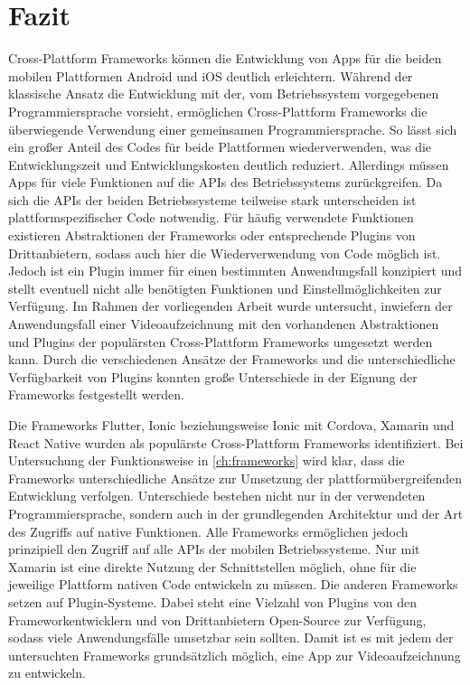 \chapter{Fazit}
\label{ch:fazit}


Cross-Plattform Frameworks können die Entwicklung von Apps für die beiden mobilen Plattformen Android und iOS deutlich erleichtern.
Während der klassische Ansatz die Entwicklung mit der, vom Betriebssystem vorgegebenen Programmiersprache vorsieht, ermöglichen Cross-Plattform Frameworks die überwiegende Verwendung einer gemeinsamen Programmiersprache.
So lässt sich ein großer Anteil des Codes für beide Plattformen wiederverwenden, was die Entwicklungszeit und Entwicklungskosten deutlich reduziert.
Allerdings müssen Apps für viele Funktionen auf die \acp{API} des Betriebssystems zurückgreifen.
Da sich die \acp{API} der beiden Betriebssysteme teilweise stark unterscheiden ist plattformspezifischer Code notwendig.
Für häufig verwendete Funktionen existieren Abstraktionen der Frameworks oder entsprechende Plugins von Drittanbietern, sodass auch hier die Wiederverwendung von Code möglich ist.
Jedoch ist ein Plugin immer für einen bestimmten Anwendungsfall konzipiert und stellt eventuell nicht alle benötigten Funktionen und Einstellmöglichkeiten zur Verfügung.
Im Rahmen der vorliegenden Arbeit wurde untersucht, inwiefern der Anwendungsfall einer Videoaufzeichnung mit den vorhandenen Abstraktionen und Plugins der populärsten Cross-Plattform Frameworks umgesetzt werden kann.
Durch die verschiedenen Ansätze der Frameworks und die unterschiedliche Verfügbarkeit von Plugins konnten große Unterschiede in der Eignung der Frameworks festgestellt werden.


Die Frameworks Flutter, Ionic beziehungsweise Ionic mit Cordova, Xamarin und React Native wurden als populärste Cross-Plattform Frameworks identifiziert.
Bei Untersuchung der Funktionsweise in \autoref{ch:frameworks} wird klar, dass die Frameworks unterschiedliche Ansätze zur Umsetzung der plattformübergreifenden Entwicklung verfolgen.
Unterschiede bestehen nicht nur in der verwendeten Programmiersprache, sondern auch in der grundlegenden Architektur und der Art des Zugriffs auf native Funktionen.
Alle Frameworks ermöglichen jedoch prinzipiell den Zugriff auf alle \acp{API} der mobilen Betriebssysteme.
Nur mit Xamarin ist eine direkte Nutzung der Schnittstellen möglich, ohne für die jeweilige Plattform nativen Code entwickeln zu müssen.
Die anderen Frameworks setzen auf Plugin-Systeme.
Dabei steht eine Vielzahl von Plugins von den Frameworkentwicklern und von Drittanbietern Open-Source zur Verfügung, sodass viele Anwendungsfälle umsetzbar sein sollten.
Damit ist es mit jedem der untersuchten Frameworks grundsätzlich möglich, eine App zur Videoaufzeichnung zu entwickeln.


